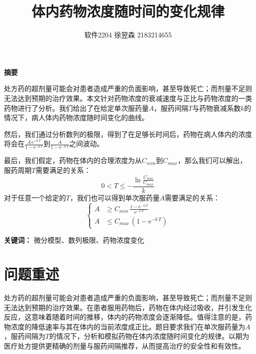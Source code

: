 \documentclass[12pt,AutoFakeSlant,AutoFakeBold]{article}
\title{体内药物浓度随时间的变化规律}
\author{软件2204 徐翌森 2183214655}
\begin{document}
\maketitle

\centerline{\large\heiti\textbf{摘要}}

处方药的超剂量可能会对患者造成严重的负面影响，甚至导致死亡；而剂量不足则无法达到预期的治疗效果。本文针对药物浓度的衰减速度与正比与药物浓度的一类药物进行了分析。我们给出了在给定单次服药量$A$，服药间隔$T$与药物衰减系数$k$的情况下，病人体内药物浓度随时间变化的曲线。

然后，我们通过分析数列的极限，得到了在足够长时间后，药物在病人体内的浓度将会在$\frac{A\,\mathrm{e}^{-k\,T}}{1 - \mathrm{e}^{-k\,T}}$到$\frac{A}{1 - \mathrm{e}^{-k\,T}}$之间波动。

最后，我们假定，药物在体内的合理浓度为从$C_{min}$到$C_{max}$，那么我们可以解出，服药周期$T$需要满足的关系：
\begin{equation*}
    0 < T \leq -\frac{\ln\frac{C_{min}}{C_{max}}}{k}
\end{equation*}
对于任意一个给定的$T$，我们也可以得到单次服药量$A$需要满足的关系：
\begin{equation*}
    \left\{
        \begin{aligned}
            A &\geq C_{min}\,\frac{1 - \mathrm{e}^{-k\,T}}{\mathrm{e}^{-k\,T}}\\
            A &\leq C_{max}\,(1 - \mathrm{e}^{-k\,T})
        \end{aligned}
    \right.
\end{equation*}

\textbf{关键词：} 微分模型、数列极限、药物浓度变化


\section{问题重述}

处方药的超剂量可能会对患者造成严重的负面影响，甚至导致死亡；而剂量不足则无法达到预期的治疗效果。在患者服用药物后，药物在体内经过吸收，并引发生化反应，这意味着随着时间的推移，体内的药物浓度会逐渐降低。值得注意的是，药物浓度的降低速率与其在体内的当前浓度成正比。题目要求我们在单次服药量为$A$，服药间隔为$T$的情况下，分析和模拟药物在体内浓度随时间变化的规律。以期为医疗处方提供更精确的剂量与服药间隔推荐，从而提高治疗的安全性和有效性。
\end{document}
